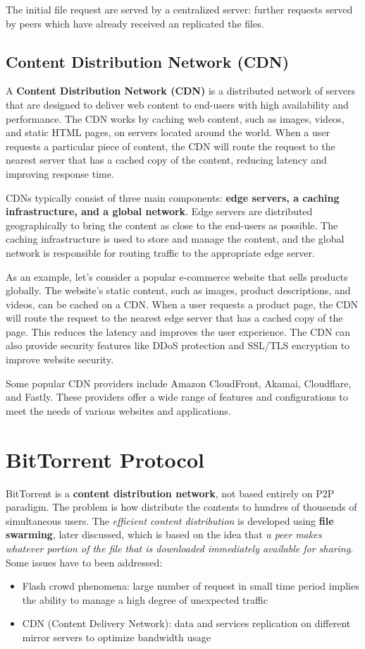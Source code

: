 \documentclass[10pt,a4paper]{report}
\begin{document}
The initial file request are served by a centralized server: further requests served by peers which have already received an replicated the files.




\subsection{Content Distribution Network (CDN)}
\label{sec:content-distribution-network-cdn}
A \textbf{Content Distribution Network (CDN)} is a distributed network of servers that are designed to deliver web content to end-users with high availability and performance. The CDN works by caching web content, such as images, videos, and static HTML pages, on servers located around the world. When a user requests a particular piece of content, the CDN will route the request to the nearest server that has a cached copy of the content, reducing latency and improving response time.

CDNs typically consist of three main components: \textbf{edge servers, a caching infrastructure, and a global network}. Edge servers are distributed geographically to bring the content as close to the end-users as possible. The caching infrastructure is used to store and manage the content, and the global network is responsible for routing traffic to the appropriate edge server.

As an example, let's consider a popular e-commerce website that sells products globally. The website's static content, such as images, product descriptions, and videos, can be cached on a CDN. When a user requests a product page, the CDN will route the request to the nearest edge server that has a cached copy of the page. This reduces the latency and improves the user experience. The CDN can also provide security features like DDoS protection and SSL/TLS encryption to improve website security.

Some popular CDN providers include Amazon CloudFront, Akamai, Cloudflare, and Fastly. These providers offer a wide range of features and configurations to meet the needs of various websites and applications.
\section{BitTorrent Protocol}\label{sec:bittorrent-protocol}
BitTorrent is a \textbf{content distribution network}, not based entirely on P2P paradigm. The problem is how distribute the contents to hundres of thousends of simultaneous users.
The \textit{efficient content distribution} is developed using \textbf{file swarming}, later discussed, which is based on the idea that \textit{a peer makes whatever portion of the file that is downloaded immediately available for sharing}.
Some issues have to been addressed:
\begin{itemize}
	\item 
	Flash crowd phenomena: large number of request in small time period implies the ability to manage a high degree of unexpected traffic
	\item 
	CDN (Content Delivery Network): data and services replication on different mirror servers to optimize bandwidth usage
\end{itemize}
\end{document}
